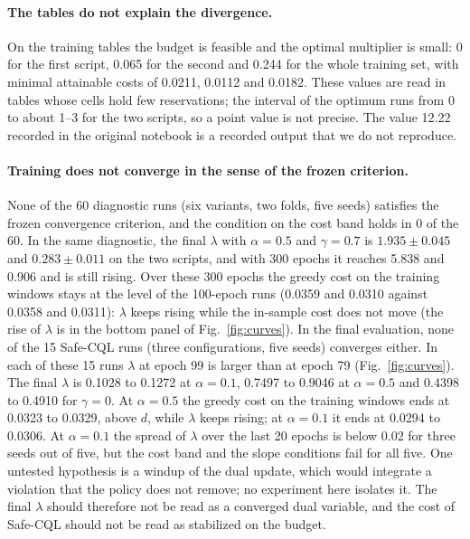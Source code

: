 \paragraph{The tables do not explain the divergence.}
On the training tables the budget is feasible and the optimal multiplier is small: 0 for the first script, 0.065 for the second and 0.244 for the whole training set, with minimal attainable costs of 0.0211, 0.0112 and 0.0182.%
These values are read in tables whose cells hold few reservations; the interval of the optimum runs from 0 to about 1--3 for the two scripts, so a point value is not precise.%
The value 12.22 recorded in the original notebook is a recorded output that we do not reproduce.%

\paragraph{Training does not converge in the sense of the frozen criterion.}
None of the 60 diagnostic runs (six variants, two folds, five seeds) satisfies the frozen convergence criterion, and the condition on the cost band holds in 0 of the 60.%
In the same diagnostic, the final $\lambda$ with $\alpha=0.5$ and $\gamma=0.7$ is $1.935\pm0.045$ and $0.283\pm0.011$ on the two scripts, and with 300 epochs it reaches 5.838 and 0.906 and is still rising.%
Over these 300 epochs the greedy cost on the training windows stays at the level of the 100-epoch runs (0.0359 and 0.0310 against 0.0358 and 0.0311): $\lambda$ keeps rising while the in-sample cost does not move (the rise of $\lambda$ is in the bottom panel of Fig.~\ref{fig:curves}).%
In the final evaluation, none of the 15 Safe-CQL runs (three configurations, five seeds) converges either.%
In each of these 15 runs $\lambda$ at epoch 99 is larger than at epoch 79 (Fig.~\ref{fig:curves}).%
The final $\lambda$ is 0.1028 to 0.1272 at $\alpha=0.1$, 0.7497 to 0.9046 at $\alpha=0.5$ and 0.4398 to 0.4910 for $\gamma=0$.%
At $\alpha=0.5$ the greedy cost on the training windows ends at 0.0323 to 0.0329, above $d$, while $\lambda$ keeps rising; at $\alpha=0.1$ it ends at 0.0294 to 0.0306.%
At $\alpha=0.1$ the spread of $\lambda$ over the last 20 epochs is below 0.02 for three seeds out of five, but the cost band and the slope conditions fail for all five.%
One untested hypothesis is a windup of the dual update, which would integrate a violation that the policy does not remove; no experiment here isolates it.%
The final $\lambda$ should therefore not be read as a converged dual variable, and the cost of Safe-CQL should not be read as stabilized on the budget.%

